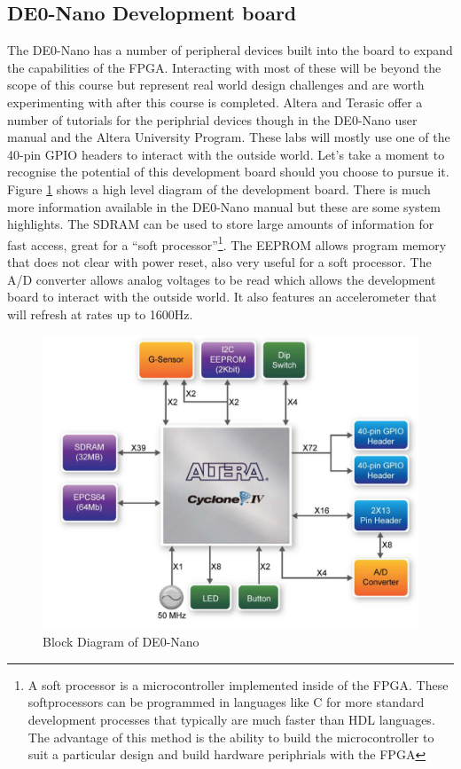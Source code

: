     \subsection{DE0-Nano Development board}
      The DE0-Nano has a number of peripheral devices built into the board to expand the capabilities of the FPGA. Interacting with most of these will be beyond the scope of this course but represent real world design challenges and are worth experimenting with after this course is completed. Altera and Terasic offer a number of tutorials for the periphrial devices though in the DE0-Nano user manual and the Altera University Program. These labs will mostly use one of the 40-pin GPIO headers to interact with the outside world. Let's take a moment to recognise the potential of this development board should you choose to pursue it. Figure \ref{DEOBlockDia} shows a high level diagram of the development board. There is much more information available in the DE0-Nano manual but these are some system highlights. The SDRAM can be used to store large amounts of information for fast access, great for a ``soft processor''\footnote{A soft processor is a microcontroller implemented inside of the FPGA. These softprocessors can be programmed in languages like C for more standard development processes that typically are much faster than HDL languages. The advantage of this method is the ability to build the microcontroller to suit a particular design and build hardware periphrials with the FPGA}. The EEPROM allows program memory that does not clear with power reset, also very useful for a soft processor. The A/D converter allows analog voltages to be read which allows the development board to interact with the outside world. It also features an accelerometer that will refresh at rates up to 1600Hz.      
      \begin{figure}[htpb]
        \includegraphics[width=.48\textwidth]{Images/DEONanoBlockDiagram.png}
        \caption{Block Diagram of DE0-Nano \cite{DE0Manual}}
        \label{DEOBlockDia}
      \end{figure}
